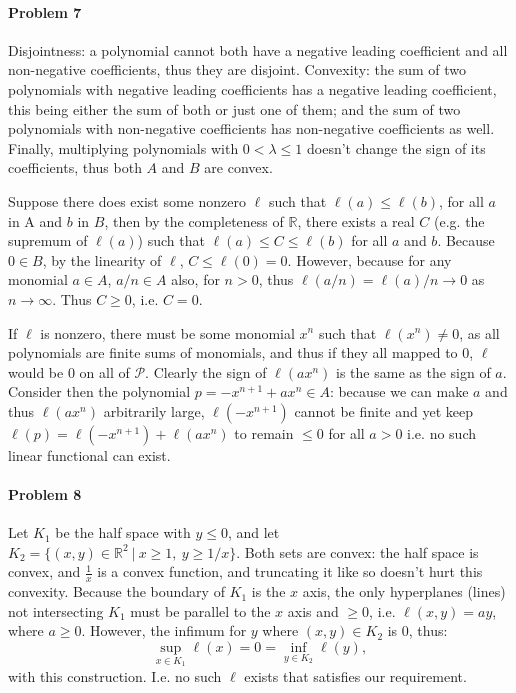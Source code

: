 \documentclass[12pt]{article}
\newcommand{\R}{\mathbb{R}}
\begin{document}
\paragraph{Problem 7}

Disjointness: a polynomial cannot both have a negative leading
coefficient and all non-negative coefficients, thus they are disjoint.
Convexity: the sum of two polynomials with negative leading coefficients has
a negative leading coefficient, this being either the sum of both or just one
of them; and the sum of two polynomials with non-negative coefficients has
non-negative coefficients as well. Finally, multiplying polynomials with
$0 < \lambda \leq 1$ doesn't change the sign of its coefficients, thus both
$A$ and $B$ are convex.

Suppose there does exist some nonzero $\ell$ such that $\ell(a) \leq \ell(b)$,
for all $a$ in A and $b$ in $B$,
then by the completeness of $\mathbb{R}$, there exists a real $C$ (e.g. the
supremum of $\ell(a)$) such that $\ell(a)\leq C\leq \ell(b)$ for all $a$ and
$b$. Because $0 \in B$, by the linearity of $\ell$, $C \leq \ell(0) = 0$.
However, because for any monomial $a \in A$, $a/n \in A$ also, for $n>0$, thus
$\ell(a/n) = \ell(a)/n \to 0$ as $n\to\infty$. Thus $C \geq 0$, i.e. $C = 0$.

If $\ell$ is nonzero, there must be some monomial $x^n$ such that $\ell(x^n) 
\neq 0$,
as all polynomials are finite sums of monomials, and thus if they all mapped
to 0, $\ell$ would be 0 on all of $\mathcal{P}$. Clearly the sign of $\ell(ax^n
)$ is the same as the sign of $a$. Consider then the polynomial $p = -x^{n+1}
+ax^n \in A$: because we can make $a$ and thus $\ell(ax^n)$
arbitrarily large, $\ell(-x^{n+1})$ cannot be finite and yet keep $\ell(p) = 
\ell(-x^{n+1}) + \ell(ax^n)$ to remain $\leq 0$ for all $a>0$ i.e. no such
linear functional can exist.

\paragraph{Problem 8}
Let $K_1$ be the half space with $y \leq 0$, and let $K_2 = \{(x,y) \in \R^2\
|\ x \geq 1,\ y \geq 1/x\}$. Both sets are convex: the half space is convex,
and $\frac{1}{x}$ is a convex function, and truncating it like so
doesn't hurt this convexity.
Because the boundary of $K_1$ is the $x$ axis,
the only hyperplanes (lines) not intersecting $K_1$ must be parallel to the $x$
axis and $\geq 0$, i.e. $\ell(x,y) = ay$, where $a \geq 0$. However, the infimum
for $y$ where $(x,y) \in K_2$ is 0, thus:
\begin{displaymath}
  \sup_{x\in K_1}\ell(x) = 0 = \inf_{y\in K_2}\ell(y),
\end{displaymath}
with this construction. I.e. no such $\ell$ exists that satisfies our
requirement.
\end{document}
